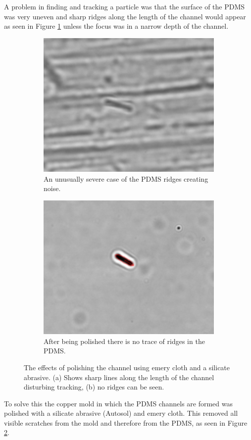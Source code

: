 A problem in finding and tracking a particle was that the surface of the PDMS was very uneven and sharp ridges along the length of the channel would appear as seen in Figure \ref{fig:unpolished} unless the focus was in a narrow depth of the channel. 
 
 \begin{figure}[H]
 \centering
 \begin{subfigure}[3a]{0.40\textwidth}
 \includegraphics[width=\textwidth]{figures/improvements/unpolished.png}
 \caption{An unusually severe case of the PDMS ridges creating noise.}\label{fig:unpolished}
 \end{subfigure}\hspace{1em}%
 \begin{subfigure}[3b]{0.40\textwidth}
 \includegraphics[width=\textwidth]{figures/improvements/polished.png}
 \caption{After being polished there is no trace of ridges in the PDMS.}\label{fig:polished}
 \end{subfigure}
 \caption{The effects of polishing the channel using emery cloth and a silicate abrasive. (a) Shows sharp lines along the length of the channel disturbing tracking, (b) no ridges can be seen.}
 \label{fig:polisheffect}
 \end{figure}

To solve this the copper mold in which the PDMS channels are formed was polished with a silicate abrasive (Autosol) and emery cloth. This removed all visible scratches from the mold and therefore from the PDMS, as seen in Figure \ref{fig:polished}.